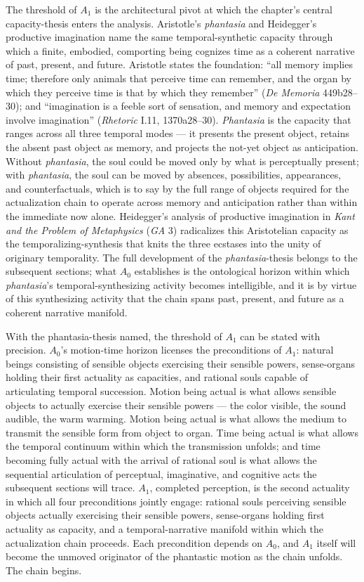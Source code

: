 The threshold of $A_1$ is the architectural pivot at which the chapter's central capacity-thesis enters the analysis. Aristotle's \textit{phantasia} and Heidegger's productive imagination name the same temporal-synthetic capacity through which a finite, embodied, comporting being cognizes time as a coherent narrative of past, present, and future. Aristotle states the foundation: ``all memory implies time; therefore only animals that perceive time can remember, and the organ by which they perceive time is that by which they remember'' (\textit{De Memoria} 449b28--30); and ``imagination is a feeble sort of sensation, and memory and expectation involve imagination'' (\textit{Rhetoric} I.11, 1370a28--30). \textit{Phantasia} is the capacity that ranges across all three temporal modes --- it presents the present object, retains the absent past object as memory, and projects the not-yet object as anticipation. Without \textit{phantasia}, the soul could be moved only by what is perceptually present; with \textit{phantasia}, the soul can be moved by absences, possibilities, appearances, and counterfactuals, which is to say by the full range of objects required for the actualization chain to operate across memory and anticipation rather than within the immediate now alone. Heidegger's analysis of productive imagination in \textit{Kant and the Problem of Metaphysics} (\textit{GA} 3) radicalizes this Aristotelian capacity as the temporalizing-synthesis that knits the three ecstases into the unity of originary temporality. The full development of the \textit{phantasia}-thesis belongs to the subsequent sections; what $A_0$ establishes is the ontological horizon within which \textit{phantasia}'s temporal-synthesizing activity becomes intelligible, and it is by virtue of this synthesizing activity that the chain spans past, present, and future as a coherent narrative manifold.

With the phantasia-thesis named, the threshold of $A_1$ can be stated with precision. $A_0$'s motion-time horizon licenses the preconditions of $A_1$: natural beings consisting of sensible objects exercising their sensible powers, sense-organs holding their first actuality as capacities, and rational souls capable of articulating temporal succession. Motion being actual is what allows sensible objects to actually exercise their sensible powers --- the color visible, the sound audible, the warm warming. Motion being actual is what allows the medium to transmit the sensible form from object to organ. Time being actual is what allows the temporal continuum within which the transmission unfolds; and time becoming fully actual with the arrival of rational soul is what allows the sequential articulation of perceptual, imaginative, and cognitive acts the subsequent sections will trace. $A_1$, completed perception, is the second actuality in which all four preconditions jointly engage: rational souls perceiving sensible objects actually exercising their sensible powers, sense-organs holding first actuality as capacity, and a temporal-narrative manifold within which the actualization chain proceeds. Each precondition depends on $A_0$, and $A_1$ itself will become the unmoved originator of the phantastic motion as the chain unfolds. The chain begins.

